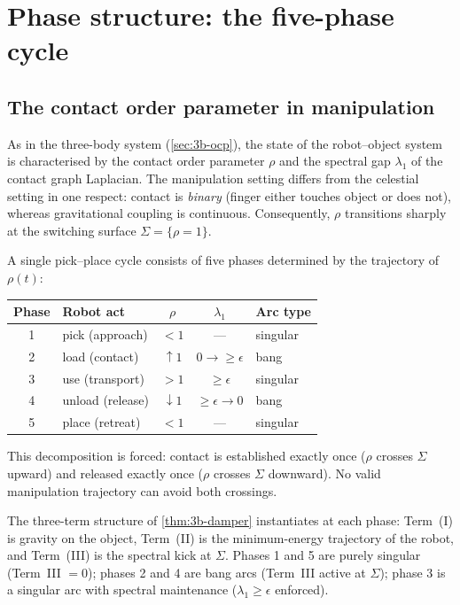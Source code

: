 \section{Phase structure: the five-phase cycle}
\label{sec:m-phases}

\subsection{The contact order parameter in manipulation}

As in the three-body system (\cref{sec:3b-ocp}), the state of the
robot--object system is characterised by the contact order parameter
$\rho$ and the spectral gap $\lambda_1$ of the contact graph
Laplacian.  The manipulation setting differs from the celestial
setting in one respect: contact is \emph{binary} (finger either
touches object or does not), whereas gravitational coupling is
continuous.  Consequently, $\rho$ transitions sharply at the
switching surface $\Sigma = \{\rho = 1\}$.

\begin{definition}\label{def:m-phases}
A single pick--place cycle consists of five phases determined by
the trajectory of $\rho(t)$:
\begin{center}
\begin{tabular}{@{}clccl@{}}
\toprule
\textbf{Phase} & \textbf{Robot act} & $\rho$ & $\lambda_1$
  & \textbf{Arc type} \\
\midrule
1 & pick (approach) & $< 1$ & --- & singular \\
2 & load (contact)  & $\uparrow 1$ & $0 \to \ge\epsilon$
  & bang \\
3 & use (transport)  & $> 1$ & $\ge \epsilon$
  & singular \\
4 & unload (release) & $\downarrow 1$ & $\ge\epsilon \to 0$
  & bang \\
5 & place (retreat)  & $< 1$ & --- & singular \\
\bottomrule
\end{tabular}
\end{center}
This decomposition is forced: contact is established exactly once
($\rho$ crosses $\Sigma$ upward) and released exactly once
($\rho$ crosses $\Sigma$ downward).  No valid manipulation
trajectory can avoid both crossings.
\end{definition}

\begin{remark}
\label{rem:m-three-term}
The three-term structure of \cref{thm:3b-damper} instantiates at
each phase: Term~(I) is gravity on the object, Term~(II) is the
minimum-energy trajectory of the robot, and Term~(III) is the
spectral kick at $\Sigma$.  Phases 1 and 5 are purely
singular (Term~III $= 0$); phases 2 and 4 are bang arcs
(Term~III active at $\Sigma$); phase 3 is a singular arc with
spectral maintenance ($\lambda_1 \ge \epsilon$ enforced).
\end{remark}


